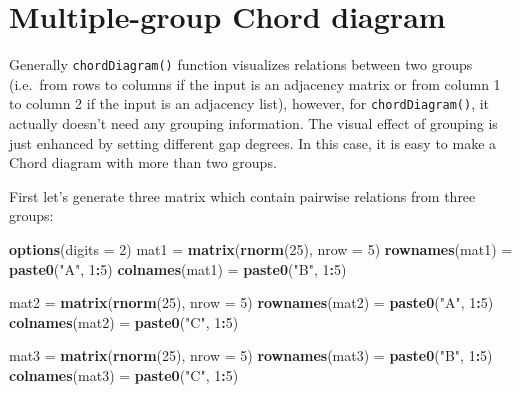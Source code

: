 \documentclass[]{book}
\newenvironment{Shaded}{\begin{snugshade}}{\end{snugshade}}
\newcommand{\KeywordTok}[1]{\textcolor[rgb]{0.13,0.29,0.53}{\textbf{#1}}}
\newcommand{\DataTypeTok}[1]{\textcolor[rgb]{0.13,0.29,0.53}{#1}}
\newcommand{\DecValTok}[1]{\textcolor[rgb]{0.00,0.00,0.81}{#1}}
\newcommand{\StringTok}[1]{\textcolor[rgb]{0.31,0.60,0.02}{#1}}
\newcommand{\OperatorTok}[1]{\textcolor[rgb]{0.81,0.36,0.00}{\textbf{#1}}}
\newcommand{\NormalTok}[1]{#1}
\theoremstyle{definition}
\theoremstyle{definition}
\theoremstyle{remark}
\begin{document}
\section{Multiple-group Chord
diagram}\label{multiple-group-chord-diagram}

Generally \texttt{chordDiagram()} function visualizes relations between
two groups (i.e.~from rows to columns if the input is an adjacency
matrix or from column 1 to column 2 if the input is an adjacency list),
however, for \texttt{chordDiagram()}, it actually doesn't need any
grouping information. The visual effect of grouping is just enhanced by
setting different gap degrees. In this case, it is easy to make a Chord
diagram with more than two groups.

First let's generate three matrix which contain pairwise relations from
three groups:

\begin{Shaded}
\begin{Highlighting}[]
\KeywordTok{options}\NormalTok{(}\DataTypeTok{digits =} \DecValTok{2}\NormalTok{)}
\NormalTok{mat1 =}\StringTok{ }\KeywordTok{matrix}\NormalTok{(}\KeywordTok{rnorm}\NormalTok{(}\DecValTok{25}\NormalTok{), }\DataTypeTok{nrow =} \DecValTok{5}\NormalTok{)}
\KeywordTok{rownames}\NormalTok{(mat1) =}\StringTok{ }\KeywordTok{paste0}\NormalTok{(}\StringTok{"A"}\NormalTok{, }\DecValTok{1}\OperatorTok{:}\DecValTok{5}\NormalTok{)}
\KeywordTok{colnames}\NormalTok{(mat1) =}\StringTok{ }\KeywordTok{paste0}\NormalTok{(}\StringTok{"B"}\NormalTok{, }\DecValTok{1}\OperatorTok{:}\DecValTok{5}\NormalTok{)}

\NormalTok{mat2 =}\StringTok{ }\KeywordTok{matrix}\NormalTok{(}\KeywordTok{rnorm}\NormalTok{(}\DecValTok{25}\NormalTok{), }\DataTypeTok{nrow =} \DecValTok{5}\NormalTok{)}
\KeywordTok{rownames}\NormalTok{(mat2) =}\StringTok{ }\KeywordTok{paste0}\NormalTok{(}\StringTok{"A"}\NormalTok{, }\DecValTok{1}\OperatorTok{:}\DecValTok{5}\NormalTok{)}
\KeywordTok{colnames}\NormalTok{(mat2) =}\StringTok{ }\KeywordTok{paste0}\NormalTok{(}\StringTok{"C"}\NormalTok{, }\DecValTok{1}\OperatorTok{:}\DecValTok{5}\NormalTok{)}

\NormalTok{mat3 =}\StringTok{ }\KeywordTok{matrix}\NormalTok{(}\KeywordTok{rnorm}\NormalTok{(}\DecValTok{25}\NormalTok{), }\DataTypeTok{nrow =} \DecValTok{5}\NormalTok{)}
\KeywordTok{rownames}\NormalTok{(mat3) =}\StringTok{ }\KeywordTok{paste0}\NormalTok{(}\StringTok{"B"}\NormalTok{, }\DecValTok{1}\OperatorTok{:}\DecValTok{5}\NormalTok{)}
\KeywordTok{colnames}\NormalTok{(mat3) =}\StringTok{ }\KeywordTok{paste0}\NormalTok{(}\StringTok{"C"}\NormalTok{, }\DecValTok{1}\OperatorTok{:}\DecValTok{5}\NormalTok{)}
\end{Highlighting}
\end{Shaded}
\end{document}
